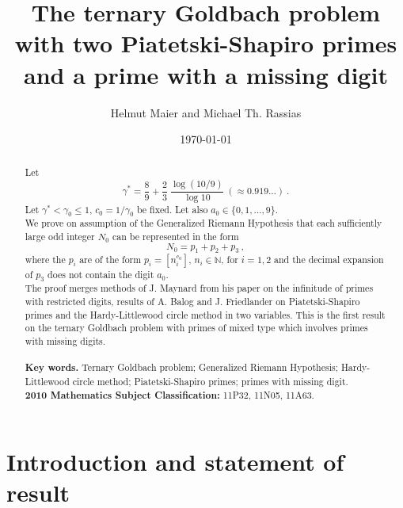 \documentclass{amsart}
\title{The ternary Goldbach problem with two Piatetski-Shapiro primes and a prime with a missing digit}
\author{Helmut Maier and Michael Th. Rassias}
\date{\today}
\numberwithin{equation}{subsection}
\begin{document}
 \maketitle
 
\begin{abstract} 
Let 
$$\gamma^*=\frac{8}{9}+\frac{2}{3}\:\frac{\log(10/9)}{\log 10}\:(\approx 0.919\ldots)\:.$$
Let $\gamma^*<\gamma_0\leq 1$, $c_0=1/\gamma_0$ be fixed. Let also $a_0\in\{0,1,\ldots, 9\}$.\\
We prove on assumption of the Generalized Riemann Hypothesis that each sufficiently large odd integer $N_0$ can be represented in the form 
$$N_0=p_1+p_2+p_3\:,$$
where the $p_i$ are of the form $p_i=[n_i^{c_0}]$, $n_i\in\mathbb{N}$, for $i=1,2$ and the decimal expansion of $p_3$ does not contain the digit $a_0$.\\
The proof merges methods of J. Maynard from his paper on the infinitude of primes with restricted digits, results of A. Balog and J. Friedlander on Piatetski-Shapiro primes and the Hardy-Littlewood circle method in two variables. This is the first result on the ternary Goldbach problem with primes of mixed type which involves primes with missing digits. \\ \\
 \textbf{Key words.} Ternary Goldbach problem; Generalized Riemann Hypothesis; Hardy-Littlewood circle method; Piatetski-Shapiro primes; primes with missing digit.\\ 
\textbf{2010 Mathematics Subject Classification:} 11P32, 11N05, 11A63.%
\newline
\end{abstract}



\section{Introduction and statement of result}
\end{document}
